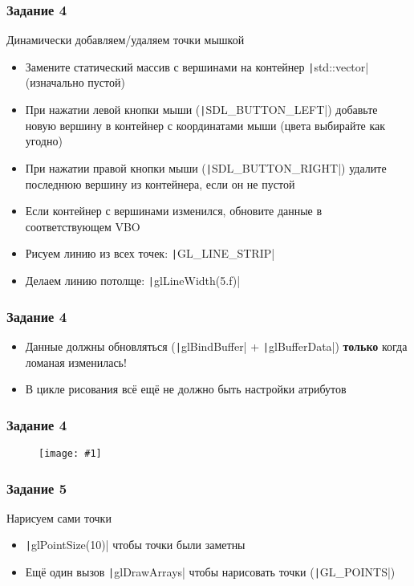\documentclass[10pt]{beamer}
\newcommand{\slideimage}[1]{
  \begin{figure}
    \begin{adjustbox}{width=\textwidth, totalheight=\textheight-2\baselineskip-2\baselineskip,keepaspectratio}
      \texttt{[image: \#1]}
    \end{adjustbox}
  \end{figure}
}
\begin{document}
\begin{frame}[fragile]
\frametitle{Задание 4}
Динамически добавляем/удаляем точки мышкой
\begin{itemize}
\item Замените статический массив с вершинами на контейнер \texttt|std::vector| (изначально пустой)
\item При нажатии левой кнопки мыши (\texttt|SDL_BUTTON_LEFT|) добавьте новую вершину в контейнер с координатами мыши (цвета выбирайте как угодно)
\item При нажатии правой кнопки мыши (\texttt|SDL_BUTTON_RIGHT|) удалите последнюю вершину из контейнера, если он не пустой
\item Если контейнер с вершинами изменился, обновите данные в соответствующем VBO
\item Рисуем линию из всех точек: \texttt|GL_LINE_STRIP|
\item Делаем линию потолще: \texttt|glLineWidth(5.f)|
\end{itemize}
\end{frame}

\begin{frame}[fragile]
\frametitle{Задание 4}
\begin{itemize}
\item Данные должны обновляться (\texttt|glBindBuffer| + \texttt|glBufferData|) \textbf{\alert{только}} когда ломаная изменилась!
\item В цикле рисования всё ещё не должно быть настройки атрибутов
\end{itemize}
\end{frame}

\begin{frame}
\frametitle{Задание 4}
\slideimage{4.png}
\end{frame}

\begin{frame}[fragile]
\frametitle{Задание 5}
Нарисуем сами точки
\begin{itemize}
\item \texttt|glPointSize(10)| чтобы точки были заметны
\item Ещё один вызов \texttt|glDrawArrays| чтобы нарисовать точки (\texttt|GL_POINTS|)
\end{itemize}
\end{frame}
\end{document}
